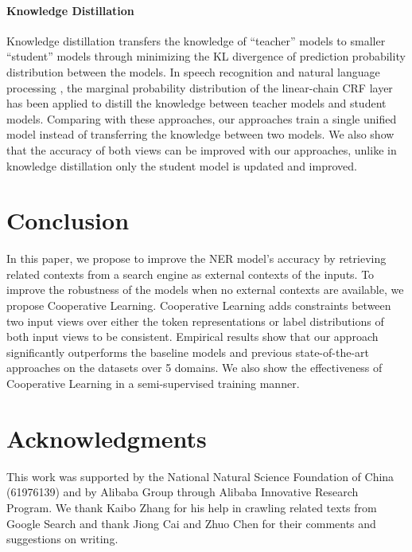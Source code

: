 \paragraph{Knowledge Distillation}
Knowledge distillation \citep{Bucilua:2006:MC:1150402.1150464,44873} transfers the knowledge of ``teacher'' models to smaller ``student'' models through minimizing the KL divergence of prediction probability distribution between the models. In speech recognition \citep{Huang2018} and natural language processing \citep{wang-etal-2020-structure,wang2020structural}, the marginal probability distribution of the linear-chain CRF layer has been applied to distill the knowledge between teacher models and student models. Comparing with these approaches, our approaches train a single unified model instead of transferring the knowledge between two models. We also show that the accuracy of both views can be improved with our approaches, unlike in knowledge distillation only the student model is updated and improved.

\section{Conclusion}
In this paper, we propose to improve the NER model's accuracy by retrieving related contexts from a search engine as external contexts of the inputs. To improve the robustness of the models when no external contexts are available, we propose Cooperative Learning. Cooperative Learning adds constraints between two input views over either the token representations or label distributions of both input views to be consistent. Empirical results show that our approach significantly outperforms the baseline models and previous state-of-the-art approaches on the datasets over 5 domains. We also show the effectiveness of Cooperative Learning in a semi-supervised training manner. %

\section*{Acknowledgments}
This work was supported by the National Natural Science Foundation of China (61976139) and by Alibaba Group through Alibaba Innovative Research Program. We thank Kaibo Zhang for his help in crawling related texts from Google Search and thank Jiong Cai and Zhuo Chen for their comments and suggestions on writing. 

\newpage

